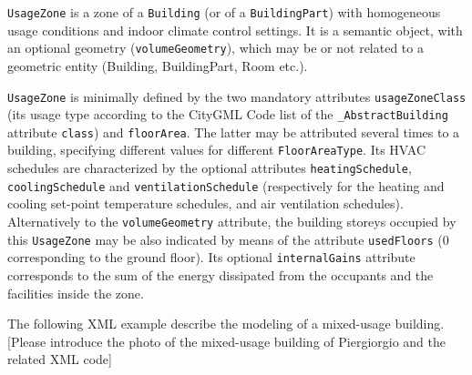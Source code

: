 \documentclass[a4paper,12pt]{article}
\begin{document}
\lstinline!UsageZone! is a zone of a \lstinline!Building! (or of a
\lstinline!BuildingPart!) with homogeneous usage conditions and indoor
climate control settings. It is a semantic object, with an optional
geometry (\lstinline!volumeGeometry!), which may be or not related to a
geometric entity (Building, BuildingPart, Room etc.).

\lstinline!UsageZone! is minimally defined by the two mandatory
attributes \lstinline!usageZoneClass! (its usage type according to the
CityGML Code list of the \lstinline!_AbstractBuilding! attribute
\lstinline!class!) and \lstinline!floorArea!. The latter may be
attributed several times to a building, specifying different values for
different \lstinline!FloorAreaType!. Its HVAC schedules are
characterized by the optional attributes \lstinline!heatingSchedule!,
\lstinline!coolingSchedule! and \lstinline!ventilationSchedule!
(respectively for the heating and cooling set-point temperature
schedules, and air ventilation schedules). Alternatively to the
\lstinline!volumeGeometry! attribute, the building storeys occupied by
this \lstinline!UsageZone! may be also indicated by means of the
attribute \lstinline!usedFloors! (0 corresponding to the ground floor).
Its optional \lstinline!internalGains! attribute corresponds to the sum
of the energy dissipated from the occupants and the facilities inside
the zone.

The following XML example describe the modeling of a mixed-usage
building. {[}Please introduce the photo of the mixed-usage building of
Piergiorgio and the related XML code{]}
\end{document}
